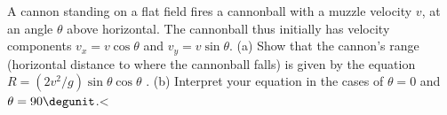   A cannon standing on a flat field fires a cannonball
with a muzzle velocity $v$, at an angle $\theta $ above
horizontal. The cannonball thus initially has velocity
components $v_x=v \cos  \theta $ and $v_y=v \sin \theta $.\hwendpart
(a) Show that the cannon's range (horizontal distance to
where the cannonball falls) is given by the equation $R=(2v^2/g)\sin\theta\cos\theta$ .\hwendpart
(b) Interpret your equation in the cases of $\theta =0$
and $\theta =90\degunit$.<%
